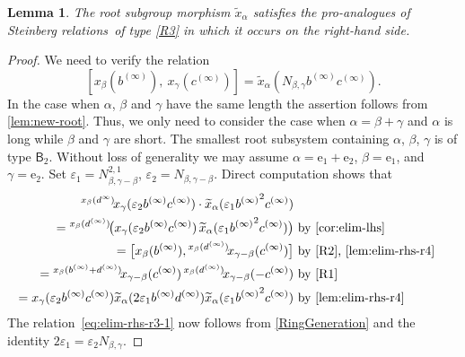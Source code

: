 \documentclass[oneside, 11pt]{amsart}
\numberwithin{equation}{section}
\newtheorem{lemma}{Lemma} \numberwithin{lemma}{section}
\theoremstyle{definition}
\theoremstyle{remark}
\newcommand{\up}[2]{{^{#1}\!{#2}}}
\newcommand{\rB}{\mathsf{B}}
\begin{document}
\begin{lemma} \label{lem:elim-rhs-r3}
 The root subgroup morphism $\widetilde{x}_\alpha$ satisfies the pro-analogues of Steinberg relations~of type \eqref{R3} in which it occurs on the right-hand side.
\end{lemma}
\begin{proof}
We need to verify the relation 
\begin{equation}\label{eq:elim-rhs-r3-1} [x_{\beta}(b^{(\infty)}),\ x_{\gamma}(c^{(\infty)})] = \widetilde{x}_{\alpha}(N_{\beta,\gamma} b^{(\infty)}c^{(\infty)}).\end{equation}
In the case when $\alpha$, $\beta$ and $\gamma$ have the same length the assertion follows from \cref{lem:new-root}. Thus, we only need to consider the case when \(\alpha = \beta + \gamma\) and \(\alpha\) is long while \(\beta\) and \(\gamma\) are short. The smallest root subsystem containing \(\alpha\), \(\beta\), \(\gamma\) is of type \(\rB_2\). Without loss of generality we may assume \(\alpha = \mathrm e_1 + \mathrm e_2\), \(\beta = \mathrm e_1\), and \(\gamma = \mathrm e_2\).
Set $\varepsilon_1 = N_{\beta,\gamma-\beta}^{2,1}$, $\varepsilon_2 = N_{\beta,\gamma-\beta}$. Direct computation shows that \begin{align*}
  \up{x_\beta(d^\infty)} x_\gamma(\varepsilon_2b^{(\infty)}c^{(\infty)}) \cdot \widetilde{x}_\alpha(\varepsilon_1 {b^{(\infty)}}^2{c^{(\infty)}}) \\
  = \up{x_\beta(d^{(\infty)})}
   {\bigl(x_\gamma(\varepsilon_2 b^{(\infty)} c^{(\infty)})\,
   \widetilde x_\alpha(\varepsilon_1
   {b^{(\infty)}}^2 c^{(\infty)})\bigr)} & \text{ by \cref{cor:elim-lhs}}\\
  = \bigl[x_\beta(b^{(\infty)}),
  \up{x_\beta(d^{(\infty)})}
   {x_{\gamma - \beta}(c^{(\infty)})}\bigr] & \text{ by~\eqref{R2}, \cref{lem:elim-rhs-r4}}\\
  = \up{x_\beta(b^{(\infty)} + d^{(\infty)})}
   {x_{\gamma - \beta}(c^{(\infty)})}\,
  \up{x_\beta(d^{(\infty)})}
   {x_{\gamma - \beta}(-c^{(\infty)})} & \text{ by~\eqref{R1}} \\  
  = x_{\gamma}(\varepsilon_2 b^{(\infty)}c^{(\infty)}) \widetilde{x}_{\alpha}(2\varepsilon_1{b^{(\infty)}}{d^{(\infty)}}) \widetilde{x}_\alpha(\varepsilon_1 {b^{(\infty)}}^2{c^{(\infty)}}) & \text{ by~\cref{lem:elim-rhs-r4}}
 \end{align*}
The relation~\eqref{eq:elim-rhs-r3-1} now follows from \cref{RingGeneration} and the identity $2\varepsilon_1 = \varepsilon_2 N_{\beta, \gamma}$. \end{proof} 
\end{document}
